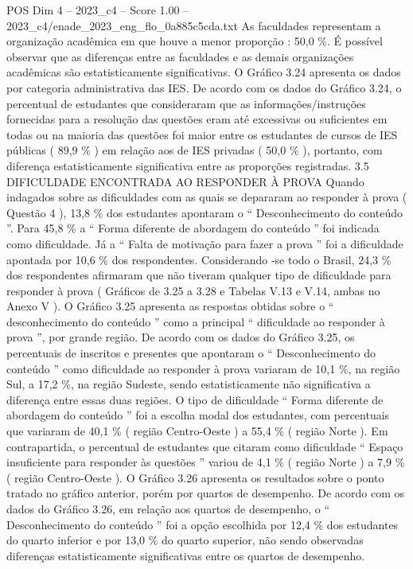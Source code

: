 \begin{textsample}{POS Dim 4 – 2023\_c4 – Score 1.00 – 2023\_c4/enade\_2023\_eng\_flo\_0a885c5cda.txt}
As faculdades representam a organização acadêmica em que houve a menor proporção : 50,0 \%.
É possível observar que as diferenças entre as faculdades e as demais organizações acadêmicas são estatisticamente significativas.
O Gráfico 3.24 apresenta os dados por categoria administrativa das IES.
De acordo com os dados do Gráfico 3.24, o percentual de estudantes que consideraram que as informações/instruções fornecidas para a resolução das questões eram até excessivas ou suficientes em todas ou na maioria das questões foi maior entre os estudantes de cursos de IES públicas ( 89,9 \% ) em relação aos de IES privadas ( 50,0 \% ), portanto, com diferença estatisticamente significativa entre as proporções registradas. 3.5 DIFICULDADE ENCONTRADA AO RESPONDER À PROVA Quando indagados sobre as dificuldades com as quais se depararam ao responder à prova ( Questão 4 ), 13,8 \% dos estudantes apontaram o “ Desconhecimento do conteúdo ”.
Para 45,8 \% a “ Forma diferente de abordagem do conteúdo ” foi indicada como dificuldade.
Já a “ Falta de motivação para fazer a prova ” foi a dificuldade apontada por 10,6 \% dos respondentes.
Considerando -se todo o Brasil, 24,3 \% dos respondentes afirmaram que não tiveram qualquer tipo de dificuldade para responder à prova ( Gráficos de 3.25 a 3.28 e Tabelas V.13 e V.14, ambas no Anexo V ).
O Gráfico 3.25 apresenta as respostas obtidas sobre o “ desconhecimento do conteúdo ” como a principal “ dificuldade ao responder à prova ”, por grande região.
De acordo com os dados do Gráfico 3.25, os percentuais de inscritos e presentes que apontaram o “ Desconhecimento do conteúdo ” como dificuldade ao responder à prova variaram de 10,1 \%, na região Sul, a 17,2 \%, na região Sudeste, sendo estatisticamente não significativa a diferença entre essas duas regiões.
O tipo de dificuldade “ Forma diferente de abordagem do conteúdo ” foi a escolha modal dos estudantes, com percentuais que variaram de 40,1 \% ( região Centro-Oeste ) a 55,4 \% ( região Norte ).
Em contrapartida, o percentual de estudantes que citaram como dificuldade “ Espaço insuficiente para responder às questões ” variou de 4,1 \% ( região Norte ) a 7,9 \% ( região Centro-Oeste ).
O Gráfico 3.26 apresenta os resultados sobre o ponto tratado no gráfico anterior, porém por quartos de desempenho.
De acordo com os dados do Gráfico 3.26, em relação aos quartos de desempenho, o “ Desconhecimento do conteúdo ” foi a opção escolhida por 12,4 \% dos estudantes do quarto inferior e por 13,0 \% do quarto superior, não sendo observadas diferenças estatisticamente significativas entre os quartos de desempenho.

\end{textsample}
